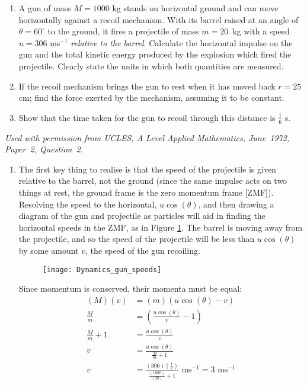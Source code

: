 
\begin{problem}[A1972AMIIQ2l] %
{\begin{enumerate}
	\item A gun of mass $M = 1000$ kg stands on horizontal ground and can move horizontally against a recoil mechanism. With its barrel raised at an angle of $\theta = 60^{\circ}$ to the ground, it fires a projectile of mass $m = 20$~kg with a speed $u = 306$ ms$^{-1}$ \emph{relative to the barrel}. Calculate the horizontal impulse on the gun and the total kinetic energy produced by the explosion which fired the projectile. Clearly state the units in which both quantities are measured.
	\item If the recoil mechanism brings the gun to rest when it has moved back $r = 25$ cm; find the force exerted by the mechanism, assuming it to be constant.
	\item Show that the time taken for the gun to recoil through this distance is $\frac{1}{6}$ s.
\end{enumerate}
}
{\textit{Used with permission from UCLES, A Level Applied Mathematics, June~1972, Paper~2, Question~2.}}
{\begin{enumerate}
	\item The first key thing to realise is that the speed of the projectile is given relative to the barrel, not the ground (since the same impulse acts on two things at rest, the ground frame is the zero momentum frame [ZMF]). Resolving the speed to the horizontal, $u \cos(\theta)$, and then drawing a diagram of the gun and projectile as particles will aid in finding the horizontal speeds in the ZMF, as in Figure \ref{fig:Dynamics_gun_speeds}. The barrel is moving away from the projectile, and so the speed of the projectile will be less than $u \cos(\theta)$ by some amount $v$, the speed of the gun recoiling.

\begin{figure}[h]
\centering
\texttt{[image: Dynamics\_gun\_speeds]}
\caption{}
\label{fig:Dynamics_gun_speeds}
\end{figure}

Since momentum is conserved, their momenta must be equal:
\begin{align*} (M)(v) &= (m)(u \cos (\theta) - v) \\  \frac{M}{m} &= \left( \frac{u \cos(\theta)}{v} - 1 \right) \\  \frac{M}{m} + 1 &= \frac{u \cos(\theta)}{v} \\ v &= \frac{u \cos(\theta)}{\frac{M}{m} + 1} \\ v &= \frac{(306)(\frac{1}{2})}{\frac{(1000)}{(20)} + 1} \textrm{ ms}^{-1} = 3 \textrm{ ms}^{-1} \end{align*}


\end{enumerate}}
\end{problem}
